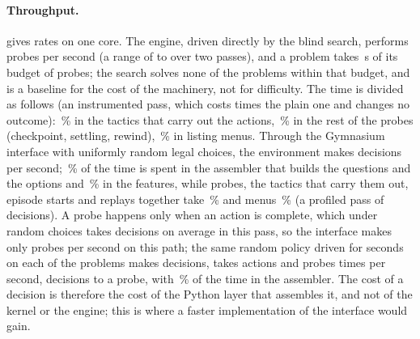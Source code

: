 \paragraph{Throughput.}
 gives rates on one core.
The engine, driven directly by the blind search, performs \blindProbesPerS{} probes per second (a range of \blindProbesMin{} to \blindProbesMax{} over two passes), and a problem takes \blindSecPerProblem\,s of its budget of \benchProbeBudget{} probes; the search solves none of the \blindProblems{} problems within that budget, and is a baseline for the cost of the machinery, not for difficulty.
The time is divided as follows (an instrumented pass, which costs \blindOverhead{} times the plain one and changes no outcome): \blindTacticShare\,\% in the tactics that carry out the actions, \blindProbeShare\,\% in the rest of the probes (checkpoint, settling, rewind), \blindMenuShare\,\% in listing menus.
Through the Gymnasium interface with uniformly random legal choices, the environment makes \gymDecPerS{} decisions per second; \gymAssemblerShare\,\% of the time is spent in the assembler that builds the questions and the options and \gymFeaturesShare\,\% in the features, while probes, the tactics that carry them out, episode starts and replays together take \gymEngineShare\,\% and menus \gymMenuShare\,\% (a profiled pass of \decN{} decisions).
A probe happens only when an action is complete, which under random choices takes \decPerProbeGym{} decisions on average in this pass, so the interface makes only \gymProbesPerS{} probes per second on this path; the same random policy driven for \uniLimitS{} seconds on each of the \blindProblems{} problems makes \uniDecPerS{} decisions, takes \uniActPerS{} actions and probes \uniProbesPerS{} times per second, \decPerProbeUni{} decisions to a probe, with \uniAssemblerShare\,\% of the time in the assembler.
The cost of a decision is therefore the cost of the Python layer that assembles it, and not of the kernel or the engine; this is where a faster implementation of the interface would gain.

